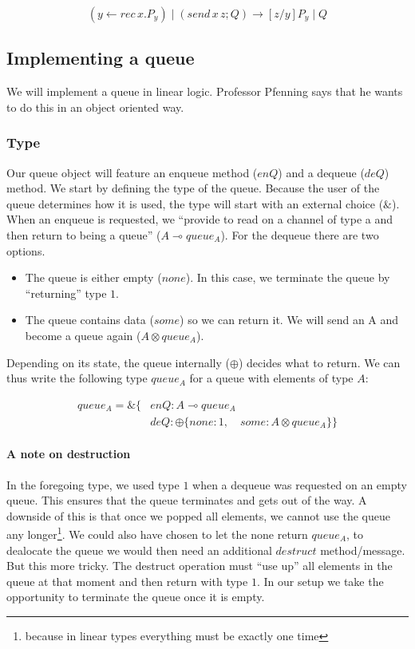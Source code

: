 \documentclass{article}
\begin{document}
	
\[  (y \leftarrow rec \, x . P_y ) \mid ( send \, x \, z ; Q ) \rightarrow  [z/y ] P_y \mid Q \]

	
	
	
	\subsection{Implementing a queue}
	We will implement a queue in linear logic. Professor Pfenning says that he wants to do this in an object oriented way. 
	
	\subsubsection{Type}
	
	Our queue object will feature an enqueue method (\(enQ\)) and a dequeue (\(deQ\)) method. We start by defining the type of the queue. Because the user of the queue determines how it is used, the type will start with an external choice (\(\&\)). When an enqueue is requested, we ``provide to read on a channel of type a and then return to being a queue'' (\(A \multimap queue_A\)). For the dequeue there are two options. 
	\begin{itemize}
		\item The queue is either empty (\(none\)). In this case, we terminate the queue by ``returning'' type $1$.
		\item The queue contains data (\(some\)) so we can return it. We will send an A and become a queue again (\(A \otimes queue_A\)).
	\end{itemize}
	Depending on its state, the queue internally (\(\oplus\)) decides what to return. We can thus write the following type \(queue_A\) for a queue with elements of type \(A\):
	
	\begin{align*}
		queue_A = \&\lbrace &enQ : A \multimap queue_A \\
		              &deQ : \oplus \lbrace  none:1 , \quad some: A \otimes queue_A \rbrace
		\rbrace
	\end{align*}
	
	\paragraph{A note on destruction} In the foregoing type, we used type \(1\) when a dequeue was requested on an empty queue. This ensures that the queue terminates and gets out of the way. A downside of this is that once we popped all elements, we cannot use the queue any longer\footnote{because in linear types everything must be exactly one time}. We could also have chosen to let the none return \(queue_A\), to dealocate the queue we would then need an additional \(destruct\) method/message. But this more tricky. The destruct operation must ``use up'' all elements in the queue at that moment and then return with type \(1\). In our setup we take the opportunity to terminate the queue once it is empty. 
	
\end{document}
